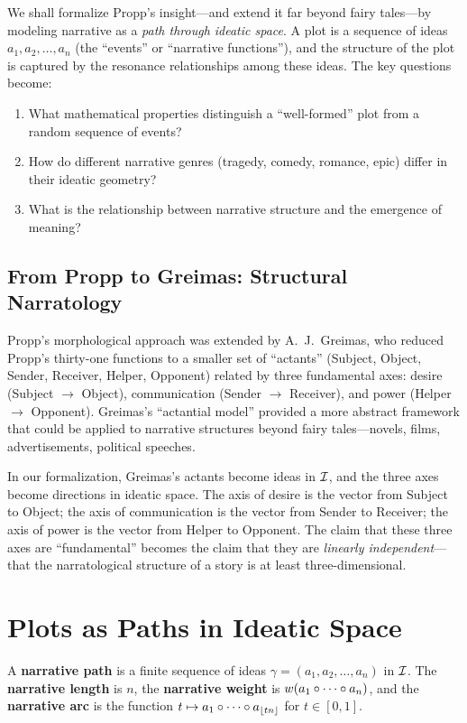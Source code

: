 We shall formalize Propp's insight---and extend it far beyond fairy tales---by
modeling narrative as a \emph{path through ideatic space}.  A plot is a
sequence of ideas $a_1, a_2, \ldots, a_n$ (the ``events'' or ``narrative
functions''), and the structure of the plot is captured by the resonance
relationships among these ideas.  The key questions become:

\begin{enumerate}
\item What mathematical properties distinguish a ``well-formed'' plot from a
random sequence of events?
\item How do different narrative genres (tragedy, comedy, romance, epic) differ
in their ideatic geometry?
\item What is the relationship between narrative structure and the emergence
of meaning?
\end{enumerate}


\subsection{From Propp to Greimas: Structural Narratology}

Propp's morphological approach was extended by A.~J.~Greimas, who reduced
Propp's thirty-one functions to a smaller set of ``actants'' (Subject, Object,
Sender, Receiver, Helper, Opponent) related by three fundamental axes:
desire (Subject $\to$ Object), communication (Sender $\to$ Receiver), and
power (Helper $\to$ Opponent).  Greimas's ``actantial model'' provided a more
abstract framework that could be applied to narrative structures beyond fairy
tales---novels, films, advertisements, political speeches.

In our formalization, Greimas's actants become ideas in $\mathcal{I}$, and the three
axes become directions in ideatic space.  The axis of desire is the vector
from Subject to Object; the axis of communication is the vector from Sender
to Receiver; the axis of power is the vector from Helper to Opponent.  The
claim that these three axes are ``fundamental'' becomes the claim that they
are \emph{linearly independent}---that the narratological structure of a
story is at least three-dimensional.


\section{Plots as Paths in Ideatic Space}

\begin{definition}
\label{def:narrative-path}
A \textbf{narrative path} is a finite sequence of ideas
$\gamma = (a_1, a_2, \ldots, a_n)$ in $\mathcal{I}$.  The \textbf{narrative length}
is $n$, the \textbf{narrative weight} is $w(a_1 \circ \cdots \circ a_n)$,
and the \textbf{narrative arc} is the function
$t \mapsto a_1 \circ \cdots \circ a_{\lfloor tn \rfloor}$
for $t \in [0, 1]$.
\end{definition}

